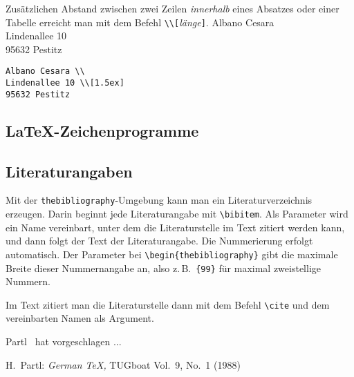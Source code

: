Zusätzlichen Abstand zwischen zwei Zeilen \emph{innerhalb}
eines Absatzes oder einer Tabelle erreicht man mit dem Befehl
\lstinline|\\[|\textit{länge}\lstinline|]|.
\exa
Albano Cesara \\
Lindenallee 10 \\[1.5ex]
95632 Pestitz
\exb
\begin{verbatim}
Albano Cesara \\
Lindenallee 10 \\[1.5ex]
95632 Pestitz
\end{verbatim}
\exc

\smallskip

\subsection{\LaTeX-Zeichenprogramme}


 

\subsection{Literaturangaben}

Mit der \texttt{thebibliography}-Umgebung kann man ein
Literaturverzeichnis erzeugen.
Darin beginnt jede Literaturangabe mit \lstinline|\bibitem|.
Als Parameter wird ein Name vereinbart, unter dem die
Literaturstelle im Text zitiert werden kann, und
dann folgt der Text der Literaturangabe.
Die Nummerierung erfolgt automatisch.
Der Parameter bei \lstinline|\begin{thebibliography}| gibt die
maximale Breite dieser Nummernangabe an, also z.\,B.\ 
\lstinline|{99}| für maximal zweistellige Nummern.

Im Text zitiert man die Literaturstelle dann mit dem Befehl \lstinline|\cite|
und dem vereinbarten Namen als Argument.


\begin{LTXexample}
Partl~\cite{pa} hat
vorgeschlagen ...
 
\begin{thebibliography}{99}
H.~Partl: \textit{German \TeX,}
TUGboat Vol.~9, No.~1 (1988)
\end{thebibliography}
\end{LTXexample}

